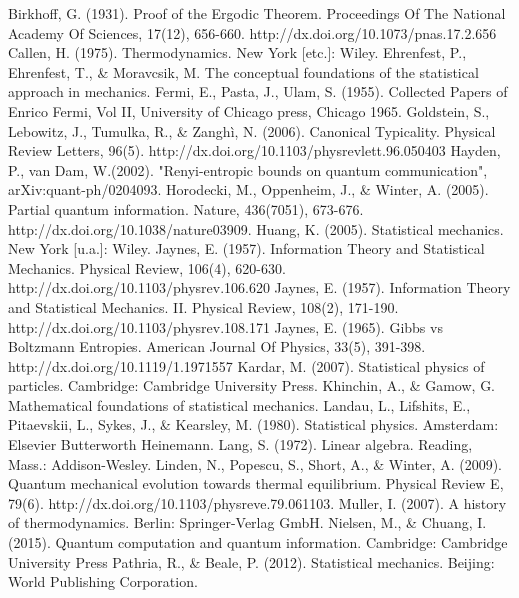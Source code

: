 \documentclass[11pt]{book}
\theoremstyle{definition}
\begin{document}
\begin{thebibliography}{10}
Birkhoff, G. (1931). Proof of the Ergodic Theorem. Proceedings Of The National Academy Of Sciences, 17(12), 656-660. http://dx.doi.org/10.1073/pnas.17.2.656
Callen, H. (1975). Thermodynamics. New York [etc.]: Wiley.
Ehrenfest, P., Ehrenfest, T., \& Moravcsik, M. The conceptual foundations of the statistical approach in mechanics.
 Fermi, E., Pasta, J., Ulam, S. (1955). Collected Papers of Enrico Fermi, Vol II, University of Chicago press, Chicago 1965.
 Goldstein, S., Lebowitz, J., Tumulka, R., \& Zanghì, N. (2006). Canonical Typicality. Physical Review Letters, 96(5). http://dx.doi.org/10.1103/physrevlett.96.050403
Hayden, P., van Dam, W.(2002). "Renyi-entropic bounds on quantum communication", arXiv:quant-ph/0204093.
Horodecki, M., Oppenheim, J., \& Winter, A. (2005). Partial quantum information. Nature, 436(7051), 673-676. http://dx.doi.org/10.1038/nature03909.
Huang, K. (2005). Statistical mechanics. New York [u.a.]: Wiley.
 Jaynes, E. (1957). Information Theory and Statistical Mechanics. Physical Review, 106(4), 620-630. http://dx.doi.org/10.1103/physrev.106.620
 Jaynes, E. (1957). Information Theory and Statistical Mechanics. II. Physical Review, 108(2), 171-190. http://dx.doi.org/10.1103/physrev.108.171
Jaynes, E. (1965). Gibbs vs Boltzmann Entropies. American Journal Of Physics, 33(5), 391-398. http://dx.doi.org/10.1119/1.1971557
Kardar, M. (2007). Statistical physics of particles. Cambridge: Cambridge University Press.
Khinchin, A., \& Gamow, G. Mathematical foundations of statistical mechanics.
 Landau, L., Lifshits, E., Pitaevskii, L., Sykes, J., \& Kearsley, M. (1980). Statistical physics. Amsterdam: Elsevier Butterworth Heinemann.
Lang, S. (1972). Linear algebra. Reading, Mass.: Addison-Wesley.
Linden, N., Popescu, S., Short, A., \& Winter, A. (2009). Quantum mechanical evolution towards thermal equilibrium. Physical Review E, 79(6). http://dx.doi.org/10.1103/physreve.79.061103.
 Muller, I. (2007). A history of thermodynamics. Berlin: Springer-Verlag GmbH.
 Nielsen, M., \& Chuang, I. (2015). Quantum computation and quantum information. Cambridge: Cambridge University Press
Pathria, R., \& Beale, P. (2012). Statistical mechanics. Beijing: World Publishing Corporation.

\end{thebibliography}
\end{document}
